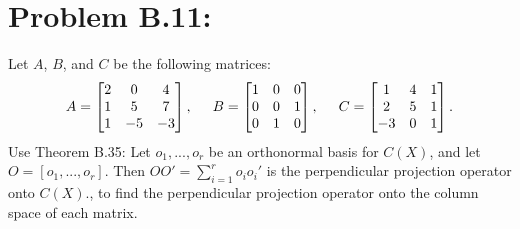 \documentclass[11pt]{article}
\begin{document}
\section*{Problem B.11:}
Let $A$, $B$, and $C$ be the following matrices:
\[
A = \begin{bmatrix}
2 & 0 & 4 \\
1 & 5 & 7 \\
1 & -5 & -3
\end{bmatrix}, \hspace{5mm}
B = \begin{bmatrix}
1 & 0 & 0 \\
0 & 0 & 1 \\
0 & 1 & 0
\end{bmatrix}, \hspace{5mm}
C = \begin{bmatrix}
1 & 4 & 1 \\
2 & 5 & 1 \\
-3 & 0 & 1
\end{bmatrix}.
\]
Use Theorem B.35:  Let $o_1, ..., o_r$ be an orthonormal basis for $C(X)$, and let $O = [o_1, ..., o_r]$.  Then $OO' = \sum_{i=1}^ro_io_i'$ is the perpendicular projection operator onto $C(X)$., to find the perpendicular projection operator onto the column space of each matrix.
\end{document}
